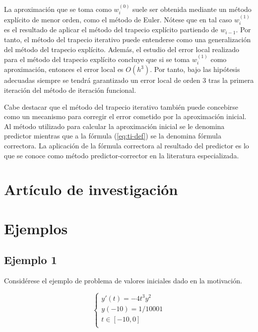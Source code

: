 \documentclass{article}
\theoremstyle{theorem-style}  %
\theoremstyle{definition-style}
\theoremstyle{example-style}
\begin{document}
	La aproximación que se toma como $w_i^{(0)}$ suele ser obtenida mediante un método explícito de menor orden, como el método de Euler. Nótese que en tal caso $w_i^{(1)}$ es el resultado de aplicar el método del trapecio explícito partiendo de $w_{i-1}$. Por tanto, el método del trapecio iterativo puede entenderse como una generalización del método del trapecio explícito. Además, el estudio del error local realizado para el método del trapecio explícito concluye que si se toma $w_i^{(1)}$ como aproximación, entonces el error local es $O(h^3)$. Por tanto, bajo las hipótesis adecuadas siempre se tendrá garantizado un error local de orden 3 tras la primera iteración del método de iteración funcional.
			
	Cabe destacar que el método del trapecio iterativo también puede concebirse como un mecanismo para corregir el error cometido por la aproximación inicial. Al método utilizado para calcular la aproximación inicial se le denomina predictor mientras que a la fórmula (\ref{eq:ti-def}) se la denomina fórmula correctora. La aplicación de la fórmula correctora al resultado del predictor es lo que se conoce como método predictor-corrector en la literatura especializada.
	
	


\section{Artículo de investigación} \label{sec:paper}

\section{Ejemplos} \label{ejemplos}

\subsection{Ejemplo 1} \label{ejemplo1}

Considérese el ejemplo de problema de valores iniciales dado en la motivación. 

		\begin{equation*}
			\begin{cases}
			y'(t) = -4 t^3 y^2 \\
			y(-10) = 1/10001 \\
			t \in [-10,0] \\
			\end{cases}
		\end{equation*}
	
\end{document}
